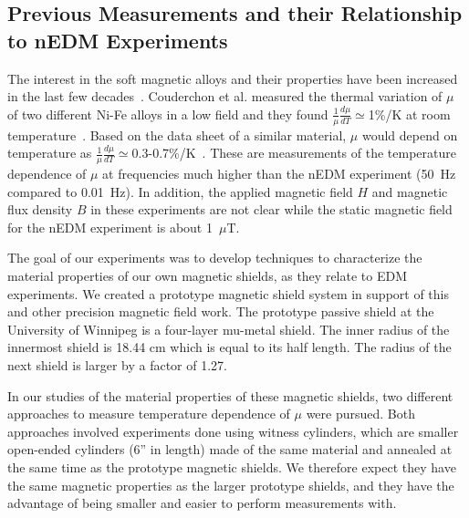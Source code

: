 \documentclass[review]{elsarticle}
\begin{document}
\subsection{Previous Measurements and their Relationship to nEDM Experiments}
The interest in the soft magnetic alloys and their properties have
been increased in the last few
decades~\cite{bib:pfeifer,bib:bozorth,bib:couderchon}. Couderchon et
al. measured the thermal variation of $\mu$ of two different Ni-Fe
alloys in a low field and they found $\frac{1}{\mu}\frac{d\mu}{dT}\simeq$1\%/K at room
temperature~\cite{bib:couderchon}. Based on the data sheet of a
similar material, $\mu$ would depend on temperature as
$\frac{1}{\mu}\frac{d\mu}{dT}\simeq$0.3-0.7\%/K~\cite{bib:kruppvdm}. These
are measurements of the temperature dependence of $\mu$ at frequencies
much higher than the nEDM experiment (50~Hz compared to 0.01~Hz). In
addition, the applied magnetic field $H$ and magnetic flux density $B$
in these experiments are not clear while the static magnetic field for
the nEDM experiment is about 1~$\mu$T.

The goal of our experiments was to develop techniques to characterize
the material properties of our own magnetic shields, as they relate to
EDM experiments.  We created a prototype magnetic shield system in
support of this and other precision magnetic field work.
The prototype passive shield at the University of Winnipeg is a four-layer mu-metal shield. The inner radius of the innermost shield is 18.44 cm which is equal to its half length. The radius of the next shield is larger by a factor of 1.27.




In our studies of the material properties of these magnetic shields,
two different approaches to measure temperature dependence of $\mu$
were pursued.  Both approaches involved experiments done using witness
cylinders, which are smaller open-ended cylinders (6'' in length) made
of the same material and annealed at the same time as the prototype
magnetic shields.  We therefore expect they have the same magnetic
properties as the larger prototype shields, and they have the
advantage of being smaller and easier to perform measurements with.
\end{document}
